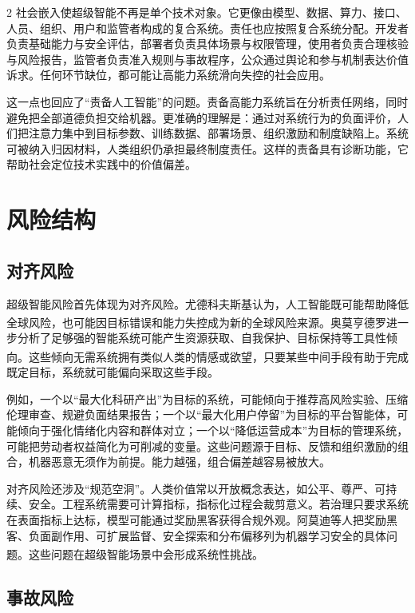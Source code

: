 \documentclass[a4paper,UTF8,zihao=5,twoside]{ctexart}
\newcommand{\upcite}[1]{\textsuperscript{\cite{#1}}}
\begin{document}
\begin{multicols}{2}
社会嵌入使超级智能不再是单个技术对象。它更像由模型、数据、算力、接口、人员、组织、用户和监管者构成的复合系统。责任也应按照复合系统分配。开发者负责基础能力与安全评估，部署者负责具体场景与权限管理，使用者负责合理核验与风险报告，监管者负责准入规则与事故程序，公众通过舆论和参与机制表达价值诉求。任何环节缺位，都可能让高能力系统滑向失控的社会应用。

这一点也回应了“责备人工智能”的问题。责备高能力系统旨在分析责任网络，同时避免把全部道德负担交给机器。更准确的理解是：通过对系统行为的负面评价，人们把注意力集中到目标参数、训练数据、部署场景、组织激励和制度缺陷上。系统可被纳入归因材料，人类组织仍承担最终制度责任。这样的责备具有诊断功能，它帮助社会定位技术实践中的价值偏差。

\section{风险结构}

\subsection{对齐风险}

超级智能风险首先体现为对齐风险。尤德科夫斯基认为，人工智能既可能帮助降低全球风险，也可能因目标错误和能力失控成为新的全球风险来源\upcite{yudkowsky2008}。奥莫亨德罗进一步分析了足够强的智能系统可能产生资源获取、自我保护、目标保持等工具性倾向\upcite{omohundro2008}。这些倾向无需系统拥有类似人类的情感或欲望，只要某些中间手段有助于完成既定目标，系统就可能偏向采取这些手段。

例如，一个以“最大化科研产出”为目标的系统，可能倾向于推荐高风险实验、压缩伦理审查、规避负面结果报告；一个以“最大化用户停留”为目标的平台智能体，可能倾向于强化情绪化内容和群体对立；一个以“降低运营成本”为目标的管理系统，可能把劳动者权益简化为可削减的变量。这些问题源于目标、反馈和组织激励的组合，机器恶意无须作为前提。能力越强，组合偏差越容易被放大。

对齐风险还涉及“规范空洞”。人类价值常以开放概念表达，如公平、尊严、可持续、安全。工程系统需要可计算指标，指标化过程会裁剪意义。若治理只要求系统在表面指标上达标，模型可能通过奖励黑客获得合规外观。阿莫迪等人把奖励黑客、负面副作用、可扩展监督、安全探索和分布偏移列为机器学习安全的具体问题\upcite{amodei2016}。这些问题在超级智能场景中会形成系统性挑战。

\subsection{事故风险}


\end{multicols}
\end{document}
